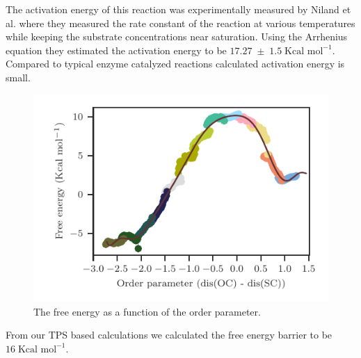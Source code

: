 \documentclass[journal=jpcbfk,manuscript=article,layout=traditional]{achemso}
\begin{document}
The activation energy of this reaction was experimentally measured by 
Niland et al. \cite{Niland21Biochem60p791} where they measured the rate 
constant of the reaction at various temperatures while keeping the 
substrate concentrations near saturation. Using the Arrhenius equation 
they estimated the activation energy to be $17.27\;\pm\;1.5\;
\text{Kcal mol}^{-1}$. Compared to typical enzyme catalyzed 
reactions calculated activation energy is small.  

\begin{figure}
\includegraphics[scale=1.0]{figures/mat2a-fenergy.pdf}
\caption{The free energy as a function of the order parameter.}
\end{figure}
From our TPS based calculations we calculated the free energy barrier to be 
$16\;\text{Kcal mol}^{-1}$.
\end{document}
